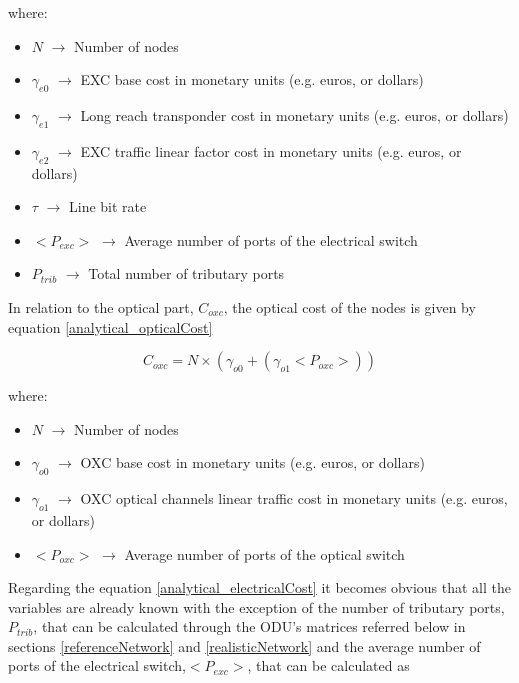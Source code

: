 \vspace{11pt}
\noindent
where:
\begin{itemize}
\item{$N$			$\rightarrow$	Number of nodes}
\item{$\gamma_{e0}$	$\rightarrow$	EXC base cost in monetary units (e.g. euros, or dollars)}
\item{$\gamma_{e1}$	$\rightarrow$	Long reach transponder cost in monetary units (e.g. euros, or dollars)}
\item{$\gamma_{e2}$	$\rightarrow$	EXC traffic linear factor cost in monetary units (e.g. euros, or dollars)}
\item{$\tau$		$\rightarrow$	Line bit rate}
\item{$<P_{exc}>$   $\rightarrow$   Average number of ports of the electrical switch}
\item{$P_{trib}$    $\rightarrow$   Total number of tributary ports}
\end{itemize}

\vspace{11pt}
In relation to the optical part, $C_{oxc}$, the optical cost of the nodes is given by equation \ref{analytical_opticalCost}

\begin{equation}
C_{oxc} = N \times \left( \gamma_{o0} + \left( \gamma_{o1} <P_{oxc}> \right) \right)
\label{analytical_opticalCost}
\end{equation}

\vspace{11pt}
\noindent
where:
\begin{itemize}
\item{$N$			$\rightarrow$	Number of nodes}
\item{$\gamma_{o0}$	$\rightarrow$	OXC base cost in monetary units (e.g. euros, or dollars)}
\item{$\gamma_{o1}$	$\rightarrow$	OXC optical channels linear traffic cost in monetary units (e.g. euros, or dollars)}
\item{$<P_{oxc}>$   $\rightarrow$   Average number of ports of the optical switch}
\end{itemize}

\vspace{13pt}
 Regarding the equation \ref{analytical_electricalCost} it becomes obvious that all the variables are already known with the exception of the number of tributary ports, $P_{trib}$, that can be calculated through the ODU's matrices referred below in sections \ref{referenceNetwork} and \ref{realisticNetwork}  and the average number of ports of the electrical switch,$<P_{exc}>$, that can be calculated as

